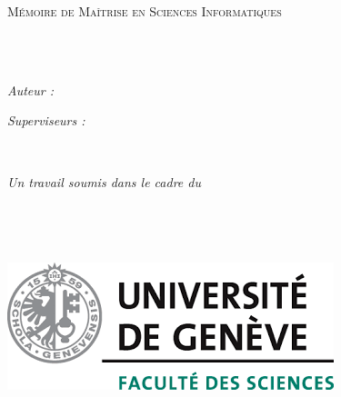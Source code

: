 \documentclass[
11pt, %
english,
french,%
singlespacing, %
headsepline, %
chapterinoneline, %
]{MastersDoctoralThesis} %
\author{David \textsc{Nogueiras Blanco}} %
\begin{document}
\frontmatter %

\pagestyle{plain} %


\begin{titlepage}
\begin{center}

\vspace*{.06\textheight}
{\scshape\LARGE \univname\par}\vspace{1.5cm} %
\textsc{\Large Mémoire de Maîtrise en Sciences Informatiques}\\[0.5cm] %

\HRule \\[0.4cm] %
{\huge \bfseries \ttitle\par}\vspace{0.4cm} %
\HRule \\[1.5cm] %
 
\begin{minipage}[t]{0.4\textwidth}
\begin{flushleft} \large
\emph{Auteur :}\\
{\authorname} %
\end{flushleft}
\end{minipage}
\begin{minipage}[t]{0.4\textwidth}
\begin{flushright} \large
\emph{Superviseurs :} \\
{\supname} %
\end{flushright}
\end{minipage}\\[2cm]
 
\vfill

\large \textit{Un travail soumis dans le cadre du \\ \degreename}\\ %
\textit{}\\
\facname\\\deptname\\[1cm]
\includegraphics[scale=0.5]{Figures/unige_sciences.png}


\end{center}
\end{titlepage}
\end{document}
